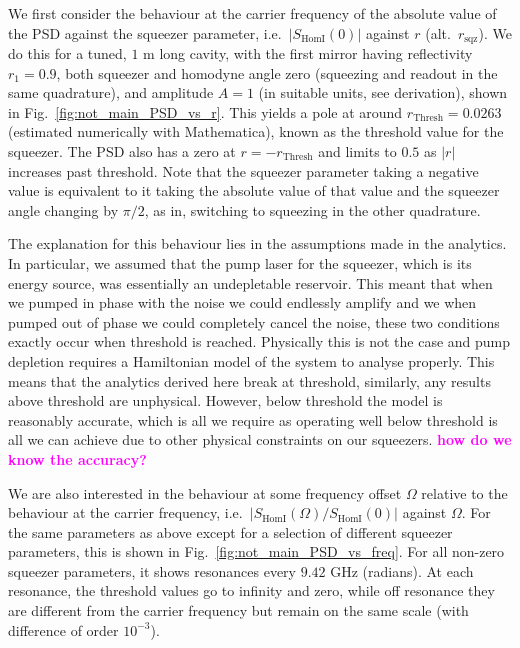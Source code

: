\documentclass[aps,pra,superscriptaddress,reprint,nofootinbib]{revtex4-1}
\newcommand{\abs}[1]{\left\lvert #1 \right\rvert}
\newcommand{\jam}[1]{\textcolor{magenta}{\textbf{#1}}}
\begin{document}
We first consider the behaviour at the carrier frequency of the absolute value of the PSD against the squeezer parameter, i.e.\ $\abs{S_{\mathrm{HomI}}(0)}$ against $r$ (alt.\ $r_\mathrm{sqz}$). We do this for a tuned, $1$ m long cavity, with the first mirror having reflectivity $r_1 = 0.9$, both squeezer and homodyne angle zero (squeezing and readout in the same quadrature), and amplitude $A = 1$ (in suitable units, see derivation), shown in Fig.~\ref{fig:not_main_PSD_vs_r}. This yields a pole at around $r_\mathrm{Thresh} = 0.0263$ (estimated numerically with Mathematica), known as the threshold value for the squeezer. The PSD also has a zero at $r = -r_\mathrm{Thresh}$ and limits to $0.5$ as $\abs{r}$ increases past threshold. Note that the squeezer parameter taking a negative value is equivalent to it taking the absolute value of that value and the squeezer angle changing by $\pi/2$, as in, switching to squeezing in the other quadrature.


The explanation for this behaviour lies in the assumptions made in the analytics. In particular, we assumed that the pump laser for the squeezer, which is its energy source, was essentially an undepletable reservoir. This meant that when we pumped in phase with the noise we could endlessly amplify and we when pumped out of phase we could completely cancel the noise, these two conditions exactly occur when threshold is reached. Physically this is not the case and pump depletion requires a Hamiltonian model of the system to analyse properly. This means that the analytics derived here break at threshold, similarly, any results above threshold are unphysical.
However, below threshold the model is reasonably accurate, which is all we require as operating well below threshold is all we can achieve due to other physical constraints on our squeezers. \jam{how do we know the accuracy?}


We are also interested in the behaviour at some frequency offset $\Omega$ relative to the behaviour at the carrier frequency, i.e.\ $\abs{S_{\mathrm{HomI}}(\Omega)/S_{\mathrm{HomI}}(0)}$ against $\Omega$. For the same parameters as above except for a selection of different squeezer parameters, this is shown in Fig.~\ref{fig:not_main_PSD_vs_freq}. For all non-zero squeezer parameters, it shows resonances every $9.42$ GHz (radians). At each resonance, the threshold values go to infinity and zero, while off resonance they are different from the carrier frequency but remain on the same scale (with difference of order $10^{-3}$).
\end{document}
